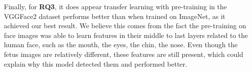 Finally, for \textbf{RQ3}, it does appear transfer learning with pre-training in the VGGFace2 dataset performs better than when trained on ImageNet, as it achieved our best result. We believe this comes from the fact the pre-training on face images was able to learn features in their middle to last layers related to the human face, such as the mouth, the eyes, the chin, the nose. Even though the fetus images are relatively different, these features are still present, which could explain why this model detected them and performed better. 


